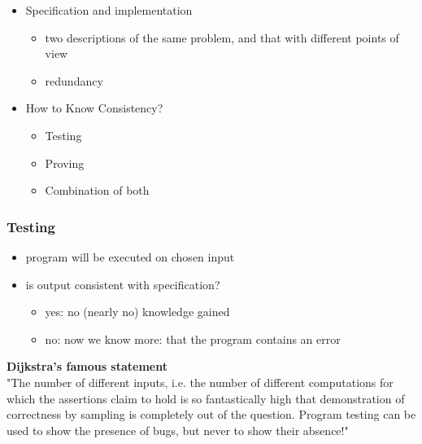 \begin{itemize}
\tightlist
\item
  Specification and implementation

  \begin{itemize}
  \tightlist
  \item
    two descriptions of the same problem, and that with different points
    of view
  \item
    redundancy
  \end{itemize}
\item
  How to Know Consistency?

  \begin{itemize}
  \tightlist
  \item
    Testing
  \item
    Proving
  \item
    Combination of both
  \end{itemize}
\end{itemize}

\hypertarget{testing}{%
\subsubsection{Testing}\label{testing}}

\begin{itemize}
\tightlist
\item
  program will be executed on chosen input
\item
  is output consistent with specification?

  \begin{itemize}
  \tightlist
  \item
    yes: no (nearly no) knowledge gained
  \item
    no: now we know more: that the program contains an error
  \end{itemize}
\end{itemize}

\begin{tcolorbox}[colback=red!5!white,colframe=red!75!black]
\textbf{Dijkstra's famous statement} \\
"The number of different inputs, i.e. the number of different computations for which the assertions claim to hold is so fantastically high that demonstration of correctness by sampling is completely out of the question. Program testing can be used to show the presence of bugs, but never to show their absence!"
\end{tcolorbox}

